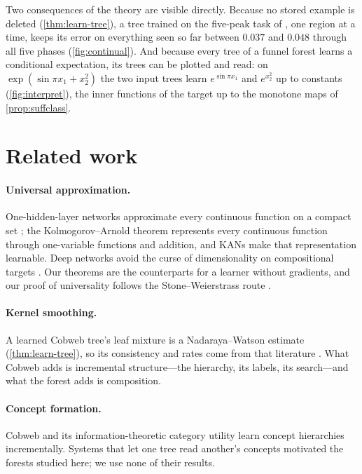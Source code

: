 \documentclass[11pt]{article}
\theoremstyle{definition}
\theoremstyle{remark}
\begin{document}
Two consequences of the theory are visible directly.  Because no stored example is deleted
(\cref{thm:learn-tree}), a tree trained on the five-peak task of \citet[Fig.~3.4]{liu2024kan}, one
region at a time, keeps its error on everything seen so far between $0.037$ and $0.048$ through
all five phases (\cref{fig:continual}).  And because every tree of a funnel forest learns a
conditional expectation, its trees can be plotted and read: on $\exp(\sin\pi x_1+x_2^2)$ the
two input trees learn $e^{\sin\pi x_1}$ and $e^{x_2^2}$ up to constants (\cref{fig:interpret}),
the inner functions of the target up to the monotone maps of \cref{prop:suffclass}.

\section{Related work}\label{sec:related}

\paragraph{Universal approximation.}  One-hidden-layer networks approximate every
continuous function on a compact set \citep{cybenko1989,hornik1989}; the
Kolmogorov--Arnold theorem \citep{kolmogorov1957,arnold1957,lorentz1966,sprecher1965}
represents every continuous function through one-variable functions and addition, and
KANs \citep{liu2024kan} make that representation learnable.  Deep networks avoid the curse of
dimensionality on compositional targets \citep{poggio2017}.  Our theorems are the
counterparts for a learner without gradients, and our proof of universality follows the
Stone--Weierstrass route \citep{stone1948}.

\paragraph{Kernel smoothing.}  A learned Cobweb tree's leaf mixture is a Nadaraya--Watson
estimate (\cref{thm:learn-tree}), so its consistency and rates come from that literature
\citep{devroye1989,gyorfi2002,wand1995}.  What Cobweb adds is incremental structure---the
hierarchy, its labels, its search---and what the forest adds is composition.

\paragraph{Concept formation.}  Cobweb \citep{fisher1987} and its information-theoretic
category utility \citep{corter1992,maclellan2026rational} learn concept hierarchies
incrementally.  Systems that let one tree read another's concepts
\citep{maclellan2021conv,singaravadivelan2026trellis} motivated the forests studied here; we
use none of their results.
\end{document}

